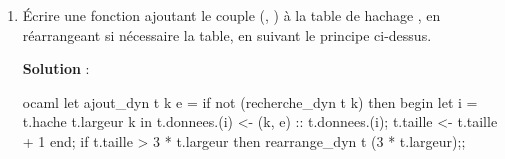 \documentclass[10pt,a4paper, varwidth]{article}
\begin{document}
	\begin{enumerate}[resume]
		\item Écrire une fonction  ajoutant le couple (, ) à la table de hachage , en réarrangeant si nécessaire la table, en suivant le principe ci-dessus.
		\if{}
        \begin{emphase}
            \textbf{Solution} : 
            \begin{center}
\begin{code}{ocaml}
let ajout_dyn t k e =
    if not (recherche_dyn t k) then begin
        let i = t.hache t.largeur k in
        t.donnees.(i) <- (k, e) :: t.donnees.(i);
        t.taille <- t.taille + 1
        end;
    if t.taille > 3 * t.largeur then
        rearrange_dyn t (3 * t.largeur);;    
\end{code}
            \end{center}
        \end{emphase}
        \fi
	\end{enumerate}
\end{document}
